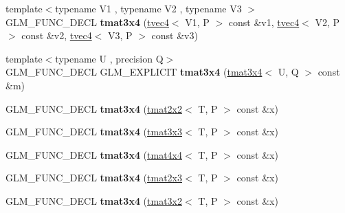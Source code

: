 \begin{DoxyCompactItemize}
\item 
\hypertarget{structglm_1_1tmat3x4_a79898618d22d01dd865e88d61aaf9016}{{\footnotesize template$<$typename V1 , typename V2 , typename V3 $>$ }\\G\-L\-M\-\_\-\-F\-U\-N\-C\-\_\-\-D\-E\-C\-L {\bfseries tmat3x4} (\hyperlink{structglm_1_1tvec4}{tvec4}$<$ V1, P $>$ const \&v1, \hyperlink{structglm_1_1tvec4}{tvec4}$<$ V2, P $>$ const \&v2, \hyperlink{structglm_1_1tvec4}{tvec4}$<$ V3, P $>$ const \&v3)}\label{structglm_1_1tmat3x4_a79898618d22d01dd865e88d61aaf9016}

\item 
\hypertarget{structglm_1_1tmat3x4_a605d52801a88671ed149ac1580f913aa}{{\footnotesize template$<$typename U , precision Q$>$ }\\G\-L\-M\-\_\-\-F\-U\-N\-C\-\_\-\-D\-E\-C\-L G\-L\-M\-\_\-\-E\-X\-P\-L\-I\-C\-I\-T {\bfseries tmat3x4} (\hyperlink{structglm_1_1tmat3x4}{tmat3x4}$<$ U, Q $>$ const \&m)}\label{structglm_1_1tmat3x4_a605d52801a88671ed149ac1580f913aa}

\item 
\hypertarget{structglm_1_1tmat3x4_aa1fc3a016998d7beba476de33dfd4e81}{G\-L\-M\-\_\-\-F\-U\-N\-C\-\_\-\-D\-E\-C\-L {\bfseries tmat3x4} (\hyperlink{structglm_1_1tmat2x2}{tmat2x2}$<$ T, P $>$ const \&x)}\label{structglm_1_1tmat3x4_aa1fc3a016998d7beba476de33dfd4e81}

\item 
\hypertarget{structglm_1_1tmat3x4_a1023b65f76ceae001ba32c1a2d35827e}{G\-L\-M\-\_\-\-F\-U\-N\-C\-\_\-\-D\-E\-C\-L {\bfseries tmat3x4} (\hyperlink{structglm_1_1tmat3x3}{tmat3x3}$<$ T, P $>$ const \&x)}\label{structglm_1_1tmat3x4_a1023b65f76ceae001ba32c1a2d35827e}

\item 
\hypertarget{structglm_1_1tmat3x4_a20f6d6616ab29bbd3ae059b3fdb6357d}{G\-L\-M\-\_\-\-F\-U\-N\-C\-\_\-\-D\-E\-C\-L {\bfseries tmat3x4} (\hyperlink{structglm_1_1tmat4x4}{tmat4x4}$<$ T, P $>$ const \&x)}\label{structglm_1_1tmat3x4_a20f6d6616ab29bbd3ae059b3fdb6357d}

\item 
\hypertarget{structglm_1_1tmat3x4_aab6ab4e1ef59451db48492ad96dfc458}{G\-L\-M\-\_\-\-F\-U\-N\-C\-\_\-\-D\-E\-C\-L {\bfseries tmat3x4} (\hyperlink{structglm_1_1tmat2x3}{tmat2x3}$<$ T, P $>$ const \&x)}\label{structglm_1_1tmat3x4_aab6ab4e1ef59451db48492ad96dfc458}

\item 
\hypertarget{structglm_1_1tmat3x4_acf230e6eebff0f618d80cf344858bb42}{G\-L\-M\-\_\-\-F\-U\-N\-C\-\_\-\-D\-E\-C\-L {\bfseries tmat3x4} (\hyperlink{structglm_1_1tmat3x2}{tmat3x2}$<$ T, P $>$ const \&x)}\label{structglm_1_1tmat3x4_acf230e6eebff0f618d80cf344858bb42}


\end{DoxyCompactItemize}
